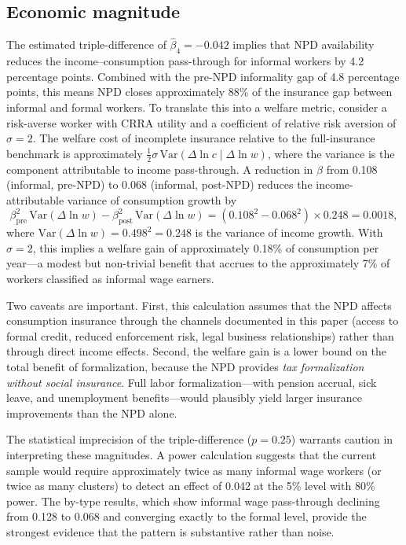 \documentclass[12pt]{article}
\begin{document}
\subsection{Economic magnitude}
\label{sec:magnitude}

The estimated triple-difference of $\hat{\beta}_4 = -0.042$ implies that NPD availability reduces the income--consumption pass-through for informal workers by 4.2 percentage points. Combined with the pre-NPD informality gap of 4.8 percentage points, this means NPD closes approximately 88\% of the insurance gap between informal and formal workers. To translate this into a welfare metric, consider a risk-averse worker with CRRA utility and a coefficient of relative risk aversion of $\sigma = 2$. The welfare cost of incomplete insurance relative to the full-insurance benchmark is approximately $\frac{1}{2} \sigma \, \text{Var}(\Delta \ln c \mid \Delta \ln w)$, where the variance is the component attributable to income pass-through. A reduction in $\beta$ from 0.108 (informal, pre-NPD) to 0.068 (informal, post-NPD) reduces the income-attributable variance of consumption growth by
\[
\beta_{\text{pre}}^2 \, \text{Var}(\Delta \ln w) - \beta_{\text{post}}^2 \, \text{Var}(\Delta \ln w) = (0.108^2 - 0.068^2) \times 0.248 = 0.0018,
\]
where $\text{Var}(\Delta \ln w) = 0.498^2 = 0.248$ is the variance of income growth. With $\sigma = 2$, this implies a welfare gain of approximately 0.18\% of consumption per year---a modest but non-trivial benefit that accrues to the approximately 7\% of workers classified as informal wage earners.

Two caveats are important. First, this calculation assumes that the NPD affects consumption insurance through the channels documented in this paper (access to formal credit, reduced enforcement risk, legal business relationships) rather than through direct income effects. Second, the welfare gain is a lower bound on the total benefit of formalization, because the NPD provides \textit{tax formalization without social insurance}. Full labor formalization---with pension accrual, sick leave, and unemployment benefits---would plausibly yield larger insurance improvements than the NPD alone.

The statistical imprecision of the triple-difference ($p = 0.25$) warrants caution in interpreting these magnitudes. A power calculation suggests that the current sample would require approximately twice as many informal wage workers (or twice as many clusters) to detect an effect of 0.042 at the 5\% level with 80\% power. The by-type results, which show informal wage pass-through declining from 0.128 to 0.068 and converging exactly to the formal level, provide the strongest evidence that the pattern is substantive rather than noise.
\end{document}
